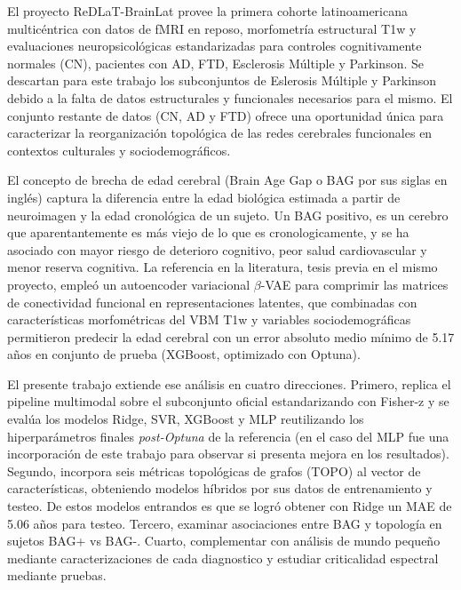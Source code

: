 \documentclass[12pt,a4paper]{article}
\begin{document}
El proyecto ReDLaT-BrainLat\cite{prado2023brainlat} provee la primera cohorte latinoamericana multicéntrica con datos de fMRI en reposo, morfometría estructural T1w y evaluaciones neuropsicológicas estandarizadas para controles cognitivamente normales (CN), pacientes con AD, FTD, Esclerosis Múltiple y Parkinson. Se descartan para este trabajo los subconjuntos de Eslerosis Múltiple y Parkinson debido a la falta de datos estructurales y funcionales necesarios para el mismo. El conjunto restante de datos (CN, AD y FTD) ofrece una oportunidad única para caracterizar la reorganización topológica de las redes cerebrales funcionales\cite{coronel2025} en contextos culturales y sociodemográficos.

El concepto de brecha de edad cerebral (Brain Age Gap o BAG por sus siglas en inglés) captura la diferencia entre la edad biológica estimada a partir de neuroimagen y la edad cronológica de un sujeto. Un BAG positivo, es un cerebro que aparentantemente es más viejo de lo que es cronologicamente, y se ha asociado con mayor riesgo de deterioro cognitivo, peor salud cardiovascular y menor reserva cognitiva\cite{moguilner2024}. La referencia en la literatura\cite{bazan2026}, tesis previa en el mismo proyecto, empleó un autoencoder variacional $\beta$-VAE\cite{higgins2022} para comprimir las matrices de conectividad funcional en representaciones latentes, que combinadas con características
morfométricas del VBM T1w y variables sociodemográficas permitieron predecir la edad cerebral con un error absoluto medio mínimo de 5.17 años en conjunto de prueba (XGBoost, optimizado con Optuna).

El presente trabajo extiende ese análisis en cuatro direcciones. Primero, replica el pipeline multimodal sobre el subconjunto oficial estandarizando con Fisher-z y se evalúa los modelos Ridge, SVR,
XGBoost y MLP reutilizando los hiperparámetros finales \emph{post-Optuna} de la referencia (en el caso del MLP fue una incorporación de este trabajo para observar si presenta mejora en los resultados). Segundo, incorpora seis métricas topológicas de grafos (TOPO) al vector de características, obteniendo modelos híbridos por sus datos de entrenamiento y testeo. De estos modelos entrandos es que se logró obtener con Ridge un MAE de 5.06 años para testeo. Tercero, examinar asociaciones entre BAG y topología en sujetos
BAG+ vs BAG-. Cuarto, complementar con análisis de mundo pequeño mediante caracterizaciones de cada diagnostico y estudiar criticalidad espectral mediante pruebas.

\end{document}
